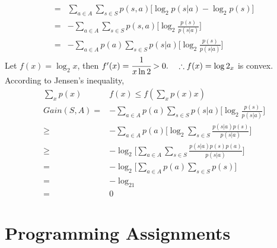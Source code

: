 \documentclass[12pt, fullpage,letterpaper]{article}
\begin{document}
\begin{enumerate}
\begin{align}
=&\sum_{a\in A}\sum_{s\in S}p(s,a)\big[\log_2p(s|a)-\log_2p(s)\big]\\
=&-\sum_{a\in A}\sum_{s\in S}p(s,a)\big[\log_2\frac{p(s)}{p(s|a)}\big]\\
=&-\sum_{a\in A}p(a)\sum_{s\in S}p(s|a)\big[\log_2\frac{p(s)}{p(s|a)}\big]
\end{align}
Let $f(x)=\log_2x$, then $f'(x)=\cfrac{1}{x\ln2}>0.\quad\therefore f(x)=\log2_x$ is convex.\\
According to Jensen’s inequality, 
\begin{align}
\sum_xp(x)&f(x) \leq f(\sum_xp(x)x)\\
Gain(S,A)=&-\sum_{a\in A}p(a)\sum_{s\in S}p(s|a)\big[\log_2\frac{p(s)}{p(s|a)}\big]\\
\geq&-\sum_{a\in A}p(a)\big[\log_2\sum_{s\in S}\frac{p(s|a)p(s)}{p(s|a)}\big]\\
\geq&-\log_2\big[\sum_{a\in A}\sum_{s\in S}\frac{p(s|a)p(s)p(a)}{p(s|a)}\big]\\
=&-\log_2\big[\sum_{a\in A}p(a)\sum_{s\in S}p(s)\big]\\
=&-\log_21\\
=&0
\end{align}
\end{enumerate}

\section{Programming Assignments}
\end{document}
